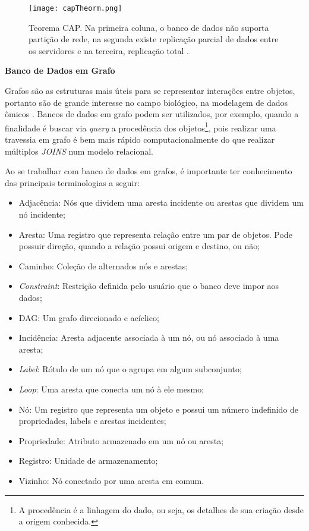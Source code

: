 \begin{figure}[h]
    \centering
    \texttt{[image: capTheorm.png]}
    \caption{Teorema CAP. Na primeira coluna, o banco de dados não suporta partição de rede, na segunda existe replicação parcial de dados entre os servidores e na terceira, replicação total \cite{CAPTheorem}.}
    \label{fig:capTheorm}
\end{figure} 

\textbf{Banco de Dados em Grafo}

\indent Grafos são as estruturas mais úteis para se representar interações entre objetos, portanto são de grande interesse no campo biológico, na modelagem de dados ômicos \cite{vicknair10}. Bancos de dados em grafo podem ser utilizados, por exemplo, quando a finalidade é buscar via \textit{query} a procedência dos objetos\footnote{A procedência é a linhagem do dado, ou seja, os detalhes de sua criação desde a origem conhecida.}, pois realizar uma travessia em grafo é bem mais rápido computacionalmente do que realizar múltiplos \textit{JOINS} num modelo relacional.

\indent Ao se trabalhar com banco de dados em grafos, é importante ter conhecimento das principais terminologias a seguir:
\begin{itemize}
\item Adjacência: Nós que dividem uma aresta incidente ou arestas que dividem um nó incidente;
\item Aresta: Uma registro que representa relação entre um par de objetos. Pode possuir direção, quando a relação possui origem e destino, ou não;
\item Caminho: Coleção de alternados nós e arestas;
\item \textit{Constraint}: Restrição definida pelo usuário que o banco deve impor aos dados;
\item DAG: Um grafo direcionado e acíclico;
\item Incidência: Aresta adjacente associada à um nó, ou nó associado à uma aresta;
\item \textit{Label}: Rótulo de um nó que o agrupa em algum subconjunto; 
\item \textit{Loop}: Uma aresta que conecta um nó à ele mesmo;
\item Nó: Um registro que representa um objeto e possui um número indefinido de propriedades, labels e arestas incidentes;
\item Propriedade: Atributo armazenado em um nó ou aresta;
\item Registro: Unidade de armazenamento;
\item Vizinho: Nó conectado por uma aresta em comum.
\end{itemize}


